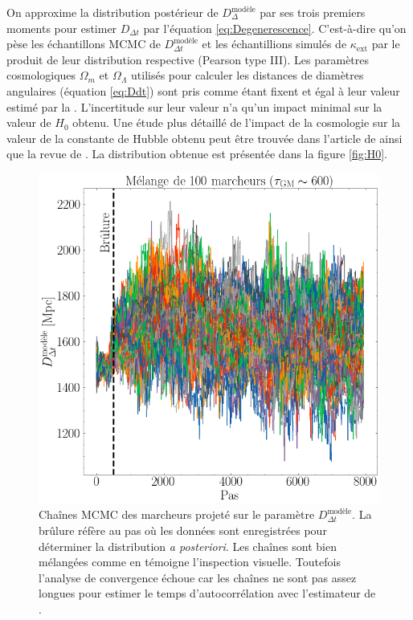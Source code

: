 \documentclass[times,10pt,twocolumn]{article}
\begin{document}
On approxime la distribution postérieur de $D_{\Delta}^{\text{modèle}}$ par 
ses trois premiers moments pour estimer 
$D_{\Delta t}$ par l'équation \eqref{eq:Degenerescence}. C'est-à-dire qu'on pèse les 
échantillons MCMC de $D_{\Delta t}^{\text{modèle}}$ et les échantillions simulés 
de $\kappa_{\mathrm{ext}}$ par 
le produit de leur distribution respective (Pearson type III). Les 
paramètres cosmologiques $\Omega_m$ et $\Omega_\Lambda$ utilisés 
pour calculer les 
distances de diamètres angulaires (équation \eqref{eq:Ddt}) sont 
pris comme étant fixent et égal à leur valeur estimé par la \citet{PlanckCollaboration2018}. 
L'incertitude sur leur valeur n'a qu'un impact minimal sur la valeur de $H_0$ obtenu. 
Une étude plus détaillé de l'impact de la cosmologie sur la valeur de la constante de 
Hubble obtenu peut être trouvée dans l'article de \citet{Suyu2013} ainsi 
que la revue de \citet{Treu2010}. La distribution obtenue est présentée dans la figure 
\ref{fig:H0}.


\begin{figure}[H]
        \centering
        \includegraphics[width=\linewidth]{ddt_walkers_mixing}
        \caption{Chaînes MCMC des marcheurs projeté sur le paramètre 
        $D_{\Delta t}^{\text{modèle}}$. La brûlure réfère au pas où les données 
sont enregistrées pour déterminer la distribution \textit{a posteriori}. Les chaînes 
sont bien mélangées comme en témoigne l'inspection visuelle. Toutefois l'analyse de 
convergence échoue car les chaînes ne sont pas assez longues pour estimer le temps 
d'autocorrélation avec l'estimateur de \citet{Goodman2010}.}
        \label{fig:mixing}
\end{figure}
\end{document}
